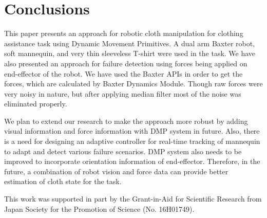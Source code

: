 \documentclass[sigconf]{acmart}
\begin{document}
\section{Conclusions}
\label{sec:conclusions}
This paper presents an approach for robotic cloth manipulation for clothing assistance task using Dynamic Movement Primitives. A dual arm Baxter robot, soft mannequin, and very thin sleeveless T-shirt were used in the task. We have also presented an approach for failure detection using forces being applied on end-effector of the robot. We have used the Baxter APIs in order to get the forces, which are calculated by Baxter Dynamics Module. Though raw forces were very noisy in nature, but after applying median filter most of the noise was eliminated properly.

We plan to extend our research to make the approach more robust by adding visual information and force information with DMP system in future. Also, there is a need for designing an adaptive controller for real-time tracking of mannequin to adapt and detect various failure scenarios. DMP system also needs to be improved to incorporate orientation information of end-effector. Therefore, in the future, a combination of robot vision and force data can provide better estimation of cloth state for the task.

\begin{acks}
	This work was supported in part by the Grant-in-Aid for Scientific Research from Japan Society for the Promotion of Science (No. 16H01749).
\end{acks}


%

\end{document}
